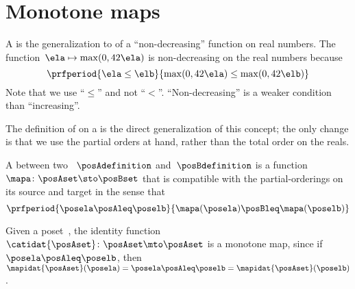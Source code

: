 
\section{Monotone maps}
\label{sec:monotonicity-monotone-maps}


A  is the generalization to  of a ``non-decreasing'' function on real numbers.
The function~$\ela \mapsto \max(0, 42 \ela)$ is non-decreasing on the real numbers because
\begin{equation}\label{eq:monotone-eq-1}
    \prfperiod{
        \ela \leq \elb
    }{
        \max(0, 42 \ela) \leq \max(0, 42 \elb)
    }
\end{equation}
Note that we use ``$\leq$'' and not ``$<$''.
``Non-decreasing'' is a weaker condition than ``increasing''.

The definition of  on a  is the direct generalization of this concept; the only change is that we use the partial orders at hand, rather than the total order on the reals.

\begin{definition}
    \label{def:monotone}
    A  between two ~$\posAdefinition$ and~$\posBdefinition$ is a function~$\mapa \colon \posAset \sto \posBset$ that is compatible with the partial-orderings on its source and target in the sense that
    \begin{equation}\label{eq:monotone-map-definition}
        \prfperiod{
            \posela \posAleq \poselb
        }{
            \mapa(\posela) \posBleq \mapa(\poselb)
        }
    \end{equation}
\end{definition}

\begin{example}
    Given a poset~\posA, the identity function~$\catidat{\posAset}\colon \posAset \mto\linebreak[0] \posAset$ is a monotone map, since if~$\posela\posAleq \poselb$, then~$\mapidat{\posAset}(\posela)=\posela \posAleq \poselb = \mapidat{\posAset}(\poselb )$.
\end{example}

